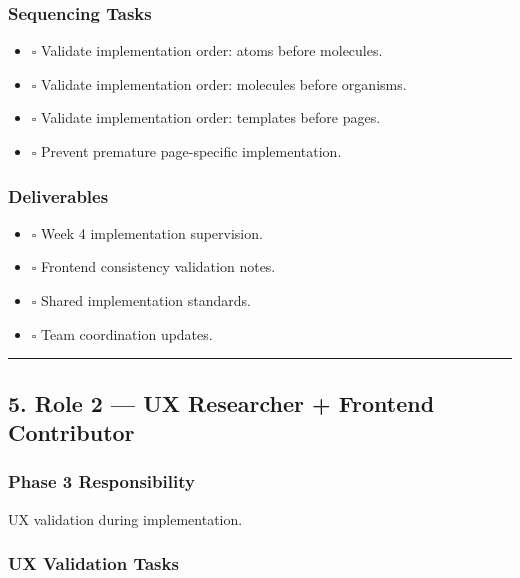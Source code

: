 \documentclass[12pt,a4paper]{article}
\providecommand{\tightlist}{\setlength{\itemsep}{0pt}\setlength{\parskip}{0pt}}
\begin{document}
\subsubsection{Sequencing Tasks}\label{sequencing-tasks}

\begin{itemize}
\tightlist
\item
  \(\square\) Validate implementation order: atoms before molecules.
\item
  \(\square\) Validate implementation order: molecules before organisms.
\item
  \(\square\) Validate implementation order: templates before pages.
\item
  \(\square\) Prevent premature page-specific implementation.
\end{itemize}

\subsubsection{Deliverables}\label{deliverables}

\begin{itemize}
\tightlist
\item
  \(\square\) Week 4 implementation supervision.
\item
  \(\square\) Frontend consistency validation notes.
\item
  \(\square\) Shared implementation standards.
\item
  \(\square\) Team coordination updates.
\end{itemize}

\begin{center}\rule{0.5\linewidth}{0.5pt}\end{center}

\subsection{5. Role 2 --- UX Researcher + Frontend Contributor}\label{role-2-ux-researcher-frontend-contributor}

\subsubsection{Phase 3 Responsibility}\label{phase-3-responsibility-1}

UX validation during implementation.

\subsubsection{UX Validation Tasks}\label{ux-validation-tasks}
\end{document}
